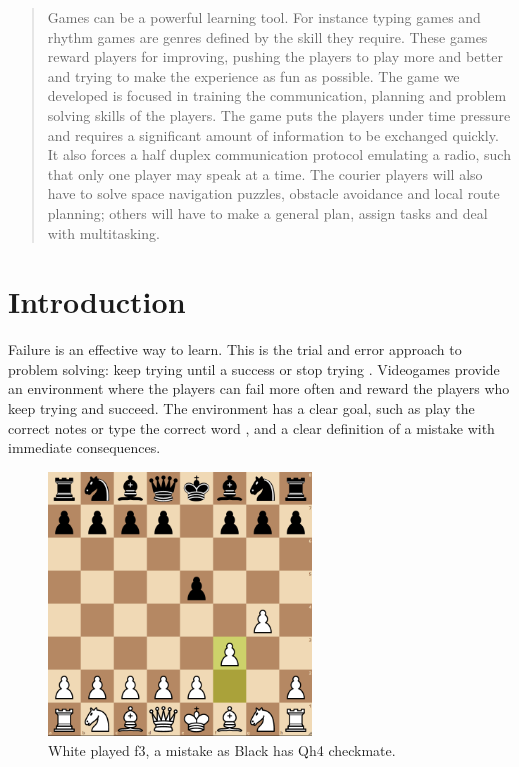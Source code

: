 \documentclass[12pt]{article}
\newcommand\blankpage{%
    \null
    \thispagestyle{empty}%
    \addtocounter{page}{-1}%
    \newpage}
\begin{document}
\clearpage

\afterpage{\blankpage}

\begin{abstract}
Games can be a powerful learning tool. For instance typing games and rhythm games are genres defined by the skill they require. These games reward players for improving, pushing the players to play more and better and trying to make the experience as fun as possible. The game we developed is focused in training the communication, planning and problem solving skills of the players. The game puts the players under time pressure and requires a significant amount of information to be exchanged quickly. It also forces a half duplex communication protocol emulating a radio, such that only one player may speak at a time. The courier players will also have to solve space navigation puzzles, obstacle avoidance and local route planning; others will have to make a general plan, assign tasks and deal with multitasking. 
\end{abstract}

\clearpage

\tableofcontents

\clearpage

\section{Introduction}
Failure is an effective way to learn. This is the trial and error approach to problem solving: keep trying until a success or stop trying \cite{try}. Videogames provide an environment where the players can fail more often and reward the players who keep trying and succeed. The environment has a clear goal, such as play the correct notes \cite{rhythm} or type the correct word \cite{typing}, and a clear definition of a mistake with immediate consequences. 

\begin{figure}[H]
\begin{center}
\includegraphics[height=7cm]{chess}
\end{center}
\caption{White played f3, a mistake as Black has Qh4 checkmate.}
\end{figure}
\end{document}
